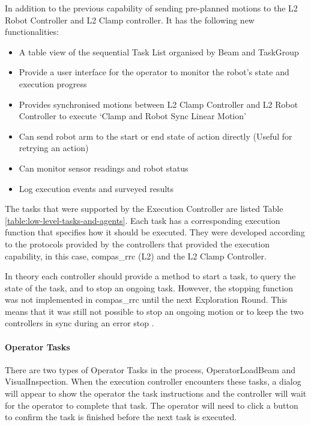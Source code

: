 In addition to the previous capability of sending pre-planned motions to the L2 Robot Controller and L2 Clamp controller. It has the following new functionalities:

\begin{itemize}
	\item A table view of the sequential Task List organised by Beam and TaskGroup

	\item Provide a user interface for the operator to monitor the robot's state and execution progress

	\item Provides synchronised motions between L2 Clamp Controller and L2 Robot Controller to execute ‘Clamp and Robot Sync Linear Motion’

	\item Can send robot arm to the start or end state of action directly (Useful for retrying an action)

	\item Can monitor sensor readings and robot status

	\item Log execution events and surveyed results

\end{itemize}

The tasks that were supported by the Execution Controller are listed Table \ref{table:low-level-tasks-and-agents}. Each task has a corresponding execution function that specifies how it should be executed. They were developed according to the protocols provided by the controllers that provided the execution capability, in this case, compas\_rrc (L2) and the L2 Clamp Controller.

In theory each controller should provide a method to start a task, to query the state of the task, and to stop an ongoing task. However, the stopping function was not implemented in compas\_rrc until the next Exploration Round. This means that it was still not possible to stop an ongoing motion or to keep the two controllers in sync during an error stop .

\paragraph{Operator Tasks}

There are two types of Operator Tasks in the process, OperatorLoadBeam and VisualInspection. When the execution controller encounters these tasks, a dialog will appear to show the operator the task instructions and the controller will wait for the operator to complete that task. The operator will need to click a button to confirm the task is finished before the next task is executed.

